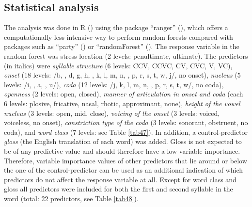 \subsection{Statistical analysis} 
The analysis was done in R (\citealt{rcoreteam_project_2019}) using the package ``ranger'' (\citealt{wright_ranger_2017}), which offers a computationally less intensive way to perform random forests compared with packages such as ``party'' (\citealt{strobl_party_2009}) or ``randomForest'' (\citealt{liaw_classification_2002}). The response variable in the random forest was stress location (2 levels: penultimate, ultimate). The predictors (in italics) were \textit{syllable structure} (6 levels: CCV, CCVC, CV, CVC, V, VC), \textit{onset} (18 levels: /b, , d, g, h, , k, l, m, n, , p, r, s, t, w, j/, no onset), \textit{nucleus} (5 levels: /i, , a, , u/), \textit{coda} (12 levels: /j, k, l, m, n, , p, r, s, t, w/, no coda), \textit{openness} (2 levels: open, closed), \textit{manner of articulation in onset and coda} (each 6 levels: plosive, fricative, nasal, rhotic, approximant, none), \textit{height of the vowel nucleus} (3 levels: open, mid, close), \textit{voicing of the onset} (3 levels: voiced, voiceless, no onset), \textit{constriction type of the coda} (3 levels: sonorant, obstruent, no coda), and \textit{word class} (7 levels: see Table \ref{tab47}). In addition, a control-predictor \textit{gloss} (the English translation of each word) was added. Gloss is not expected to be of any predictive value and should therefore have a low variable importance. Therefore, variable importance values of other predictors that lie around or below the one of the control-predictor can be used as an additional indication of which predictors do not affect the response variable at all. Except for word class and gloss all predictors were included for both the first and second syllable in the word (total: 22 predictors, see Table \ref{tab48}).\par


